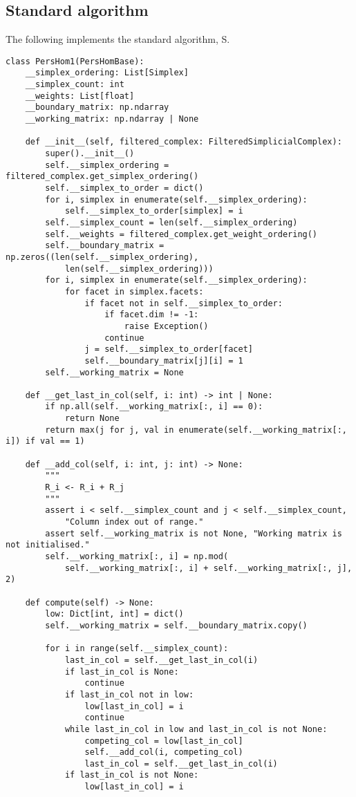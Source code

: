 \subsection{Standard algorithm}

The following implements the standard algorithm, \textsc{S}. 

\begin{verbatim}
class PersHom1(PersHomBase):
    __simplex_ordering: List[Simplex]
    __simplex_count: int
    __weights: List[float]
    __boundary_matrix: np.ndarray
    __working_matrix: np.ndarray | None

    def __init__(self, filtered_complex: FilteredSimplicialComplex):
        super().__init__()
        self.__simplex_ordering = filtered_complex.get_simplex_ordering()
        self.__simplex_to_order = dict()
        for i, simplex in enumerate(self.__simplex_ordering):
            self.__simplex_to_order[simplex] = i
        self.__simplex_count = len(self.__simplex_ordering)
        self.__weights = filtered_complex.get_weight_ordering()
        self.__boundary_matrix = np.zeros((len(self.__simplex_ordering), 
            len(self.__simplex_ordering)))
        for i, simplex in enumerate(self.__simplex_ordering):
            for facet in simplex.facets:
                if facet not in self.__simplex_to_order:
                    if facet.dim != -1:
                        raise Exception()
                    continue
                j = self.__simplex_to_order[facet]
                self.__boundary_matrix[j][i] = 1
        self.__working_matrix = None

    def __get_last_in_col(self, i: int) -> int | None:
        if np.all(self.__working_matrix[:, i] == 0):
            return None
        return max(j for j, val in enumerate(self.__working_matrix[:, i]) if val == 1)

    def __add_col(self, i: int, j: int) -> None:
        """
        R_i <- R_i + R_j
        """
        assert i < self.__simplex_count and j < self.__simplex_count, 
            "Column index out of range."
        assert self.__working_matrix is not None, "Working matrix is not initialised."
        self.__working_matrix[:, i] = np.mod(
            self.__working_matrix[:, i] + self.__working_matrix[:, j], 2)

    def compute(self) -> None:
        low: Dict[int, int] = dict()
        self.__working_matrix = self.__boundary_matrix.copy()

        for i in range(self.__simplex_count):
            last_in_col = self.__get_last_in_col(i)
            if last_in_col is None:
                continue
            if last_in_col not in low:
                low[last_in_col] = i
                continue
            while last_in_col in low and last_in_col is not None:
                competing_col = low[last_in_col]
                self.__add_col(i, competing_col)
                last_in_col = self.__get_last_in_col(i)
            if last_in_col is not None:
                low[last_in_col] = i


\end{verbatim}
